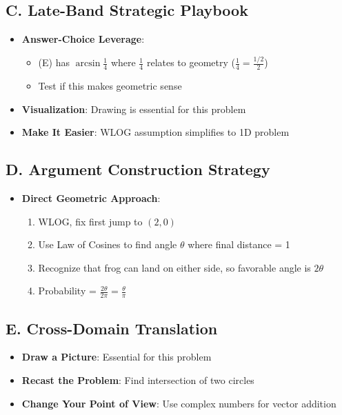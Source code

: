 \documentclass[12pt]{article}
\begin{document}
\begin{strategicbox}
\subsection*{C. Late-Band Strategic Playbook}
\begin{itemize}[leftmargin=*]
    \item \textbf{Answer-Choice Leverage}: 
    \begin{itemize}
        \item (E) has $\arcsin \frac{1}{4}$ where $\frac{1}{4}$ relates to geometry ($\frac{1}{4} = \frac{1/2}{2}$)
        \item Test if this makes geometric sense
    \end{itemize}
    \item \textbf{Visualization}: Drawing is essential for this problem
    \item \textbf{Make It Easier}: WLOG assumption simplifies to 1D problem
\end{itemize}

\subsection*{D. Argument Construction Strategy}
\begin{itemize}[leftmargin=*]
    \item \textbf{Direct Geometric Approach}: 
    \begin{enumerate}
        \item WLOG, fix first jump to $(2, 0)$
        \item Use Law of Cosines to find angle $\theta$ where final distance = 1
        \item Recognize that frog can land on either side, so favorable angle is $2\theta$
        \item Probability = $\frac{2\theta}{2\pi} = \frac{\theta}{\pi}$
    \end{enumerate}
\end{itemize}

\subsection*{E. Cross-Domain Translation}
\begin{itemize}[leftmargin=*]
    \item \textbf{Draw a Picture}: Essential for this problem
    \item \textbf{Recast the Problem}: Find intersection of two circles
    \item \textbf{Change Your Point of View}: Use complex numbers for vector addition
\end{itemize}
\end{strategicbox}
\end{document}
